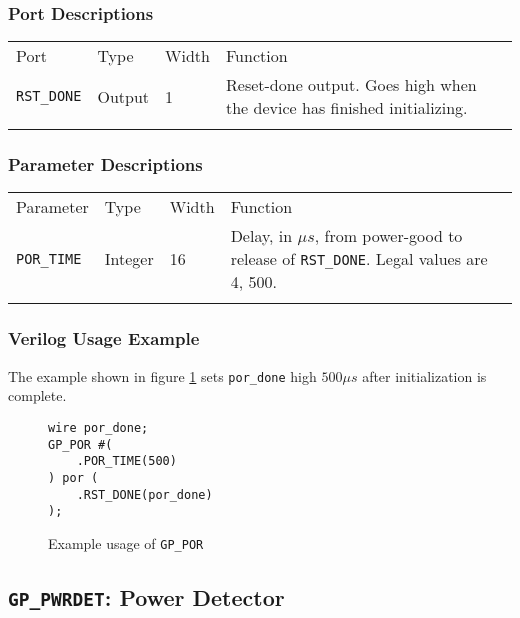 \documentclass[11pt]{article}
\newcommand{\tokenstyle}[1]{\texttt{#1}}
\newcommand{\wirestyle}[1]{\texttt{#1}}
\newcommand{\whenstyle}[1]{{\fontseries{sb}\selectfont#1}}
\newcommand{\thinhline}{\Xhline{1\arrayrulewidth}}
\newcommand{\thickhline}{\Xhline{2.5\arrayrulewidth}}
\begin{document}

\subsubsection{Port Descriptions}

\begin{tabularx}{\textwidth}{lllX}
\thinhline
\whenstyle{Port} & \whenstyle{Type} & \whenstyle{Width} & \whenstyle{Function} \\
\thickhline
\tokenstyle{RST\_DONE} & Output & 1 & Reset-done output. Goes high when the device has finished initializing.\\
\thinhline
\end{tabularx}

\subsubsection{Parameter Descriptions}

\begin{tabularx}{\textwidth}{lllX}
\thinhline
\whenstyle{Parameter} & \whenstyle{Type} & \whenstyle{Width} & \whenstyle{Function} \\
\thickhline
\tokenstyle{POR\_TIME} & Integer & 16 & Delay, in $\mu s$, from power-good to release of \tokenstyle{RST\_DONE}. Legal values are 4, 500.\\
\thinhline
\end{tabularx}

\subsubsection{Verilog Usage Example}

The example shown in figure \ref{gp-por-example} sets \wirestyle{por\_done} high $500 \mu s$ after initialization is complete.

\begin{figure}[h]
\begin{lstlisting}
wire por_done;
GP_POR #(
	.POR_TIME(500)
) por (
	.RST_DONE(por_done)
);
\end{lstlisting}
\caption{Example usage of \tokenstyle{GP\_POR}}
\label{gp-por-example}
\end{figure}


\pagebreak
\clearpage
\subsection{\tokenstyle{GP\_PWRDET}: Power Detector}
\label{gp-pwrdet}
\end{document}
